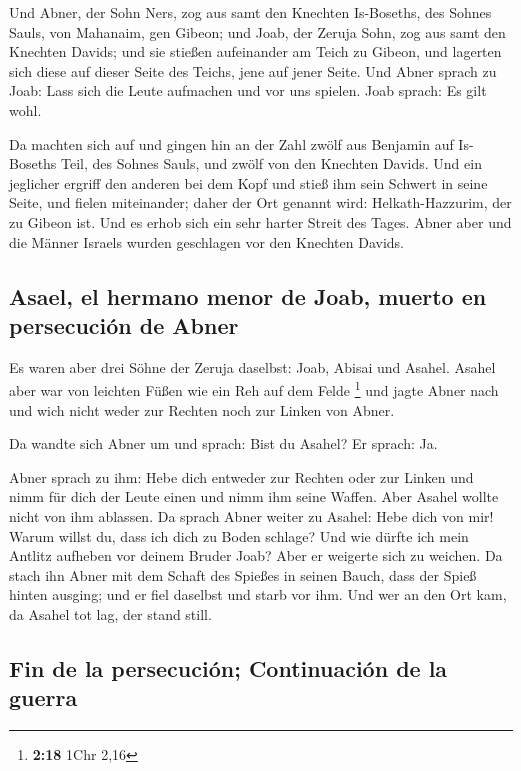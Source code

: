  Und Abner, der Sohn Ners, zog aus samt den Knechten
Is-Boseths, des Sohnes Sauls, von Mahanaim, gen Gibeon; 
und Joab, der Zeruja Sohn, zog aus samt den Knechten Davids; und sie
stießen aufeinander am Teich zu Gibeon, und lagerten sich diese auf
dieser Seite des Teichs, jene auf jener Seite.  Und Abner
sprach zu Joab: Lass sich die Leute aufmachen und vor uns spielen. Joab
sprach: Es gilt wohl.

 Da machten sich auf und gingen hin an der Zahl zwölf aus
Benjamin auf Is-Boseths Teil, des Sohnes Sauls, und zwölf von den
Knechten Davids.  Und ein jeglicher ergriff den anderen
bei dem Kopf und stieß ihm sein Schwert in seine Seite, und fielen
miteinander; daher der Ort genannt wird: Helkath-Hazzurim, der zu Gibeon
ist.  Und es erhob sich ein sehr harter Streit des Tages.
Abner aber und die Männer Israels wurden geschlagen vor den Knechten
Davids.

\hypertarget{asael-el-hermano-menor-de-joab-muerto-en-persecuciuxf3n-de-abner}{%
\subsection{Asael, el hermano menor de Joab, muerto en persecución de
Abner}\label{asael-el-hermano-menor-de-joab-muerto-en-persecuciuxf3n-de-abner}}

 Es waren aber drei Söhne der Zeruja daselbst: Joab,
Abisai und Asahel. Asahel aber war von leichten Füßen wie ein Reh auf
dem Felde \footnote{\textbf{2:18} 1Chr 2,16}  und jagte
Abner nach und wich nicht weder zur Rechten noch zur Linken von Abner.

 Da wandte sich Abner um und sprach: Bist du Asahel? Er
sprach: Ja.

 Abner sprach zu ihm: Hebe dich entweder zur Rechten oder
zur Linken und nimm für dich der Leute einen und nimm ihm seine Waffen.
Aber Asahel wollte nicht von ihm ablassen.  Da sprach
Abner weiter zu Asahel: Hebe dich von mir! Warum willst du, dass ich
dich zu Boden schlage? Und wie dürfte ich mein Antlitz aufheben vor
deinem Bruder Joab?  Aber er weigerte sich zu weichen. Da
stach ihn Abner mit dem Schaft des Spießes in seinen Bauch, dass der
Spieß hinten ausging; und er fiel daselbst und starb vor ihm. Und wer an
den Ort kam, da Asahel tot lag, der stand still.

\hypertarget{fin-de-la-persecuciuxf3n-continuaciuxf3n-de-la-guerra}{%
\subsection{Fin de la persecución; Continuación de la
guerra}\label{fin-de-la-persecuciuxf3n-continuaciuxf3n-de-la-guerra}}

